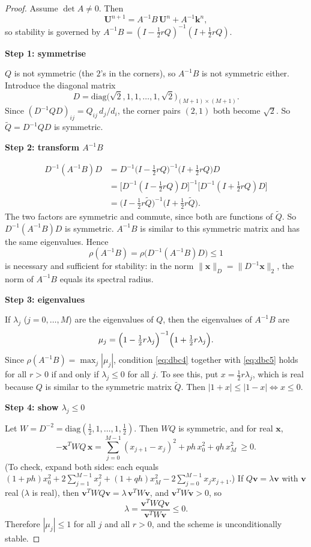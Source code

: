\documentclass[11pt,a4paper]{article}
\numberwithin{equation}{section}
\theoremstyle{spacedplain}
\theoremstyle{spaceddefinition}
\theoremstyle{spacedremark}
\newcommand{\step}[1]{\par\addvspace{0.6em}\noindent\textbf{#1}\par\nobreak}
\begin{document}
\begin{proof}
Assume \(\det A\ne0\).  Then
\[
  \mathbf U^{n+1}=A^{-1}B\,\mathbf U^n+A^{-1}\mathbf k^n,
\]
so stability is governed by
\(A^{-1}B=(I-\tfrac12rQ)^{-1}(I+\tfrac12rQ)\).

\step{Step 1: symmetrise}
\(Q\) is not symmetric (the \(2\)'s in
the corners), so \(A^{-1}B\) is not symmetric either.  Introduce the
diagonal matrix
\[
  D=\mathrm{diag}\bigl(\sqrt2,1,1,\dots,1,\sqrt2\bigr)_{(M+1)\times(M+1)}.
\]
Since \((D^{-1}QD)_{ij}=Q_{ij}\,d_j/d_i\), the corner pairs \((2,1)\)
both become \(\sqrt2\).  So \(\widetilde Q=D^{-1}QD\) is symmetric.

\step{Step 2: transform \(A^{-1}B\)}

\begin{align*}
  D^{-1}(A^{-1}B)D
  &=D^{-1}\bigl(I-\tfrac12rQ\bigr)^{-1}\bigl(I+\tfrac12rQ\bigr)D\\
  &=\bigl[D^{-1}(I-\tfrac12rQ)D\bigr]^{-1}\bigl[D^{-1}(I+\tfrac12rQ)D\bigr]\\
  &=\bigl(I-\tfrac12r\widetilde Q\bigr)^{-1}\bigl(I+\tfrac12r\widetilde Q\bigr).
\end{align*}
The two factors are symmetric and commute, since both are functions of
\(\widetilde Q\).  So \(D^{-1}(A^{-1}B)D\) is symmetric.  \(A^{-1}B\) is
similar to this symmetric matrix and has the same eigenvalues.  Hence
\begin{equation}\label{eq:dbc4}
  \rho(A^{-1}B)=\rho\bigl(D^{-1}(A^{-1}B)D\bigr)\le1
\end{equation}
is necessary and sufficient for stability: in the norm
\(\|\mathbf x\|_D=\|D^{-1}\mathbf x\|_2\), the norm of \(A^{-1}B\)
equals its spectral radius.

\step{Step 3: eigenvalues}
If \(\lambda_j\) (\(j=0,\dots,M\)) are
the eigenvalues of \(Q\), then the eigenvalues of \(A^{-1}B\) are
\begin{equation}\label{eq:dbc5}
  \mu_j=\Bigl(1-\tfrac12r\lambda_j\Bigr)^{-1}\Bigl(1+\tfrac12r\lambda_j\Bigr).
\end{equation}
Since \(\rho(A^{-1}B)=\max_j|\mu_j|\), condition \eqref{eq:dbc4}
together with \eqref{eq:dbc5} holds for all \(r>0\) if and only if
\(\lambda_j\le0\) for all \(j\).  To see this, put
\(x=\tfrac12r\lambda_j\), which is real because \(Q\) is similar to the
symmetric matrix \(\widetilde Q\).  Then \(|1+x|\le|1-x|\iff x\le0\).

\step{Step 4: show \(\lambda_j\le0\)}
Let
\(W=D^{-2}=\mathrm{diag}(\tfrac12,1,\dots,1,\tfrac12)\).  Then \(WQ\) is
symmetric, and for real \(\mathbf x\),
\[
  -\mathbf x^TWQ\,\mathbf x
  =\sum_{j=0}^{M-1}(x_{j+1}-x_j)^2+ph\,x_0^2+qh\,x_M^2\ \ge0.
\]
(To check, expand both sides: each equals
\((1+ph)x_0^2+2\sum_{j=1}^{M-1}x_j^2+(1+qh)x_M^2
-2\sum_{j=0}^{M-1} x_jx_{j+1}\).)  If \(Q\mathbf v=\lambda\mathbf v\) with
\(\mathbf v\) real (\(\lambda\) is real), then
\(\mathbf v^TWQ\mathbf v=\lambda\,\mathbf v^TW\mathbf v\), and
\(\mathbf v^TW\mathbf v>0\), so
\[
  \lambda=\frac{\mathbf v^TWQ\mathbf v}{\mathbf v^TW\mathbf v}\le0.
\]
Therefore \(|\mu_j|\le1\) for all \(j\) and all \(r>0\), and the scheme
is unconditionally stable.
\end{proof}
\end{document}
